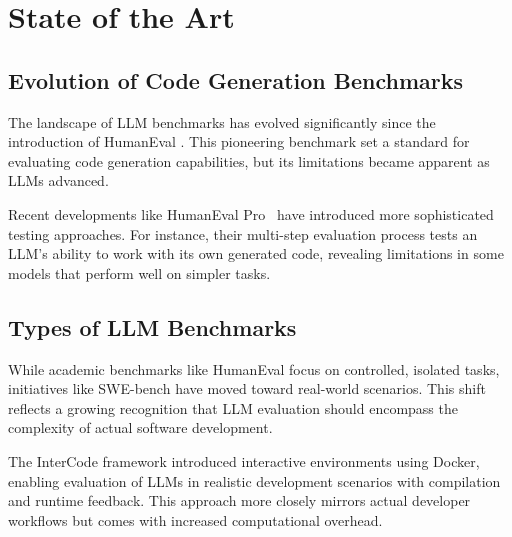 \chapter{State of the Art}

\section{Evolution of Code Generation Benchmarks}

The landscape of LLM benchmarks has evolved significantly since the introduction of HumanEval \cite{chen2021evaluatinglargelanguagemodels}. This pioneering benchmark set a standard for evaluating code generation capabilities, but its limitations became apparent as LLMs advanced.

Recent developments like HumanEval Pro~\cite{yu2024humanevalprombpppro} have introduced more sophisticated testing approaches. For instance, their multi-step evaluation process tests an LLM's ability to work with its own generated code, revealing limitations in some models that perform well on simpler tasks.


\section{Types of LLM Benchmarks}


While academic benchmarks like HumanEval focus on controlled, isolated tasks, initiatives like SWE-bench \cite{jimenez2024swebenchlanguagemodelsresolve} have moved toward real-world scenarios. This shift reflects a growing recognition that LLM evaluation should encompass the complexity of actual software development.

The InterCode framework \cite{yang2023intercodestandardizingbenchmarkinginteractive} introduced interactive environments using Docker, enabling evaluation of LLMs in realistic development scenarios with compilation and runtime feedback. This approach more closely mirrors actual developer workflows but comes with increased computational overhead.


